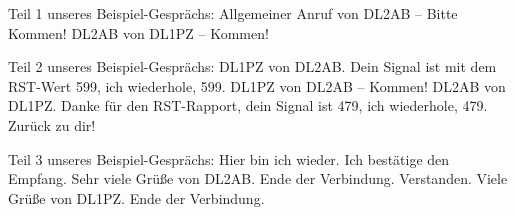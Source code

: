 \begin{frame}Teil 1 unseres Beispiel-Gesprächs:
    \pause{}
    \pause{}
    \pause
    Allgemeiner Anruf von DL2AB -- Bitte Kommen!
    \pause
    DL2AB von DL1PZ -- Kommen!
\end{frame}

\begin{frame}Teil 2 unseres Beispiel-Gesprächs:
    \pause{}\pause{}
    \pause
    DL1PZ von DL2AB. Dein Signal ist mit dem RST-Wert 599, ich wiederhole, 599. DL1PZ von DL2AB -- Kommen!
    \pause
    DL2AB von DL1PZ. Danke für den RST-Rapport, dein Signal ist 479, ich wiederhole, 479. Zurück zu dir!



\end{frame}

\begin{frame}Teil 3 unseres Beispiel-Gesprächs:
    \pause{}\pause{}
    \pause
    Hier bin ich wieder. Ich bestätige den Empfang. Sehr viele Grüße von DL2AB. Ende der Verbindung.
    \pause
    Verstanden. Viele Grüße von DL1PZ. Ende der Verbindung.



\end{frame}

